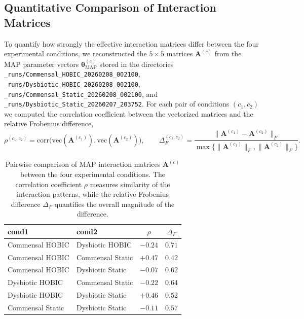 \documentclass[11pt,a4paper]{article}
\begin{document}
\subsection{Quantitative Comparison of Interaction Matrices}
To quantify how strongly the effective interaction matrices differ between the four experimental conditions, we reconstructed the $5 \times 5$ matrices $\mathbf{A}^{(c)}$ from the MAP parameter vectors $\boldsymbol{\theta}^{(c)}_{\text{MAP}}$ stored in the directories \texttt{\_runs/Commensal\_HOBIC\_20260208\_002100}, \texttt{\_runs/Dysbiotic\_HOBIC\_20260208\_002100}, \texttt{\_runs/Commensal\_Static\_20260208\_002100}, and \texttt{\_runs/Dysbiotic\_Static\_20260207\_203752}. For each pair of conditions $(c_1, c_2)$ we computed the correlation coefficient between the vectorized matrices and the relative Frobenius difference,
\begin{equation}
  \rho^{(c_1,c_2)} = \mathrm{corr}\big(\mathrm{vec}(\mathbf{A}^{(c_1)}), \mathrm{vec}(\mathbf{A}^{(c_2)})\big), \qquad
  \Delta_F^{(c_1,c_2)} = \frac{\lVert \mathbf{A}^{(c_1)} - \mathbf{A}^{(c_2)} \rVert_F}{\max\{\lVert \mathbf{A}^{(c_1)} \rVert_F, \lVert \mathbf{A}^{(c_2)} \rVert_F\}}.
\end{equation}

\begin{table}[H]
\centering
\caption{Pairwise comparison of MAP interaction matrices $\mathbf{A}^{(c)}$ between the four experimental conditions. The correlation coefficient $\rho$ measures similarity of the interaction patterns, while the relative Frobenius difference $\Delta_F$ quantifies the overall magnitude of the difference.}
\begin{tabular}{l l c c}
\hline
cond1 & cond2 & $\rho$ & $\Delta_F$ \\
\hline
Commensal HOBIC  & Dysbiotic HOBIC   & $-0.24$ & $0.71$ \\
Commensal HOBIC  & Commensal Static  & $+0.47$ & $0.42$ \\
Commensal HOBIC  & Dysbiotic Static  & $-0.07$ & $0.62$ \\
Dysbiotic HOBIC  & Commensal Static  & $-0.22$ & $0.64$ \\
Dysbiotic HOBIC  & Dysbiotic Static  & $+0.46$ & $0.52$ \\
Commensal Static & Dysbiotic Static  & $-0.11$ & $0.57$ \\
\hline
\end{tabular}
\label{tab:A_pairwise_comparison}
\end{table}
\end{document}
